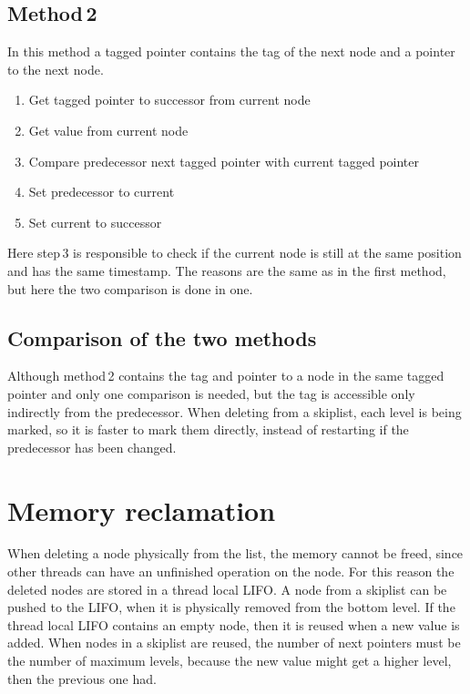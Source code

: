 \documentclass{article}
\begin{document}
\subsection{Method\,2}

In this method a tagged pointer contains the tag of the next node and a pointer to the next node.

\begin{enumerate}
\item Get tagged pointer to successor from current node
\item Get value from current node
\item Compare predecessor next tagged pointer with current tagged pointer
\item Set predecessor to current
\item Set current to successor
\end{enumerate}

Here step\,3 is responsible to check if the current node is still at the same position and has the same timestamp.
The reasons are the same as in the first method, but here the two comparison is done in one.

\subsection{Comparison of the two methods}

Although method\,2 contains the tag and pointer to a node in the same tagged pointer and only one comparison is needed, but the tag is accessible only indirectly from the predecessor.
When deleting from a skiplist, each level is being marked, so it is faster to mark them directly, instead of restarting if the predecessor has been changed. 

\section{Memory reclamation}

When deleting a node physically from the list, the memory cannot be freed, since other threads can have an unfinished operation on the node.
For this reason the deleted nodes are stored in a thread local LIFO.
A node from a skiplist can be pushed to the LIFO, when it is physically removed from the bottom level.
If the thread local LIFO contains an empty node, then it is reused when a new value is added.
When nodes in a skiplist are reused, the number of next pointers must be the number of maximum levels, because the new value might get a higher level, then the previous one had.
\end{document}
